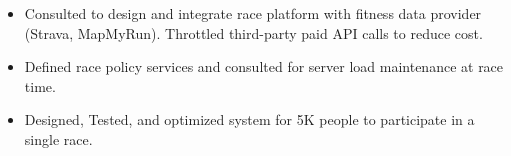 \documentclass[10pt,a4paper,ragged2e]{altacv}
\begin{document}
    \begin{itemize}
        \item Consulted to design and integrate race platform with fitness data provider (Strava, MapMyRun). Throttled third-party paid API calls to reduce cost.
        \item Defined race policy services and consulted for server load maintenance at race time.
        \item Designed, Tested, and optimized system for 5K people to participate in a single race.
    \end{itemize}

















%
\end{document}
